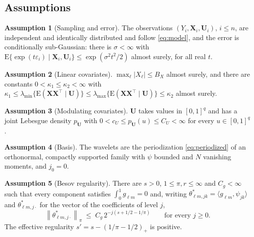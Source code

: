 \documentclass[12pt]{article} %
\theoremstyle{definition}
\newtheorem{assumption}{Assumption}
\newcommand{\E}{\mathrm{E}}
\newcommand{\T}{^{\top}}
\newcommand{\norm}[1]{\left\lVert #1 \right\rVert}
\newcommand{\inner}[2]{\langle #1, #2 \rangle}
\newcommand{\cv}{\ell}
\newcommand{\md}{m}
\newcommand{\lev}{j}
\newcommand{\tsl}{k}
\newcommand{\jzero}{j_{0}}
\newcommand{\bX}{\mathbf{X}}
\newcommand{\bU}{\mathbf{U}}
\newcommand{\gcomp}[2]{g_{#1#2}}
\newcommand{\wav}[2]{\psi_{#1#2}}
\newcommand{\coefs}[4]{\theta^{*}_{#1#2,#3#4}}
\newcommand{\seff}{s'}
\newcommand{\lmin}{\lambda_{\min}}
\newcommand{\lmaxx}{\lambda_{\max}}
\begin{document}
\subsection{Assumptions}
\label{sec:assumptions}

\begin{assumption}[Sampling and error]
\label{ass:sample}
The observations $(Y_i,\bX_i,\bU_i)$, $i \le n$, are independent and
identically distributed and follow \eqref{eq:model}, and the error is
conditionally sub-Gaussian: there is $\sigma < \infty$ with
$\E\{\exp(t\varepsilon_i) \mid \bX_i,\bU_i\} \le \exp(\sigma^2t^2/2)$ almost
surely, for all real $t$.
\end{assumption}

\begin{assumption}[Linear covariates]
\label{ass:X}
$\max_{\cv}|X_{\cv}| \le B_X$ almost surely, and there are constants
$0 < \kappa_1 \le \kappa_2 < \infty$ with
$\kappa_1 \le \lmin\{\E(\bX\bX\T\mid\bU)\} \le
\lmaxx\{\E(\bX\bX\T\mid\bU)\} \le \kappa_2$ almost surely.
\end{assumption}

\begin{assumption}[Modulating covariates]
\label{ass:U}
$\bU$ takes values in $[0,1]^q$ and has a joint Lebesgue density $p_{\bU}$
with $0 < c_U \le p_{\bU}(u) \le C_U < \infty$ for every $u \in [0,1]^q$.
\end{assumption}

\begin{assumption}[Basis]
\label{ass:basis}
The wavelets are the periodization \eqref{eq:periodized} of an orthonormal,
compactly supported family with $\psi$ bounded and $N$ vanishing moments, and
$\jzero = 0$.
\end{assumption}

\begin{assumption}[Besov regularity]
\label{ass:besov}
There are $s > 0$, $1 \le \pi, r \le \infty$ and $C_g < \infty$ such that
every component satisfies $\int_0^1 \gcomp{\cv}{\md} = 0$ and, writing
$\coefs{\cv}{\md}{\lev}{\tsl} = \inner{\gcomp{\cv}{\md}}{\wav{\lev}{\tsl}}$
and $\theta^{*}_{\cv\md,\lev\cdot}$ for the vector of the coefficients of
level $\lev$,
\[
  \norm{\theta^{*}_{\cv\md,\lev\cdot}}_{\pi} \;\le\;
  C_g\,2^{-\lev(s + 1/2 - 1/\pi)} \qquad \text{for every } \lev \ge 0 .
\]
The effective regularity $\seff = s - (1/\pi - 1/2)_{+}$ is positive.
\end{assumption}
\end{document}
